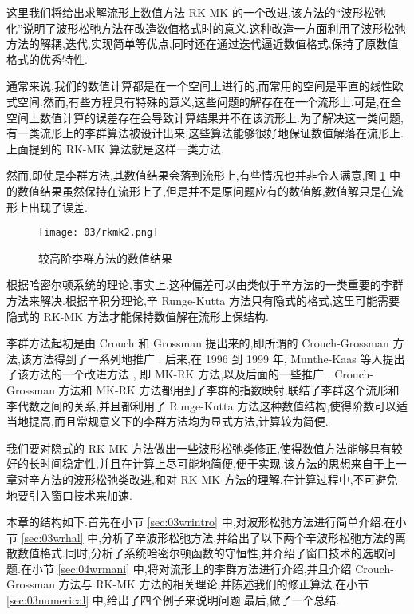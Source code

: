 这里我们将给出求解流形上数值方法 RK-MK \cite{arieh2005liegroup} 的一个改进,该方法的``波形松弛化''说明了波形松弛方法在改造数值格式时的意义.这种改造一方面利用了波形松弛方法的解耦,迭代,实现简单等优点,同时还在通过迭代逼近数值格式,保持了原数值格式的优秀特性.

通常来说,我们的数值计算都是在一个空间上进行的,而常用的空间是平直的线性欧式空间.然而,有些方程具有特殊的意义,这些问题的解存在在一个流形上.可是,在全空间上数值计算的误差存在会导致计算结果并不在该流形上.为了解决这一类问题,有一类流形上的李群算法被设计出来,这些算法能够很好地保证数值解落在流形上.上面提到的 RK-MK 算法就是这样一类方法.

然而,即使是李群方法,其数值结果会落到流形上,有些情况也并非令人满意,图 \ref{fig:rkmk2} 中的数值结果虽然保持在流形上了,但是并不是原问题应有的数值解,数值解只是在流形上出现了误差.
\begin{figure}[h!]
  \centering
  \texttt{[image: 03/rkmk2.png]}
  \caption{较高阶李群方法的数值结果}
  \label{fig:rkmk2}
\end{figure}

根据哈密尔顿系统的理论,事实上,这种偏差可以由类似于辛方法的一类重要的李群方法来解决.根据辛积分理论,辛 Runge-Kutta 方法只有隐式的格式,这里可能需要隐式的 RK-MK 方法才能保持数值解在流形上保结构.

李群方法起初是由 Crouch 和 Grossman \cite{crouch1993numerical} 提出来的,即所谓的 Crouch-Grossman 方法,该方法得到了一系列地推广 \cite{faleinsen2001multi,zaletkin2010numerical,bulychev2001numerical,buono2003numerical,billo1992numerical}. 后来,在 1996 到 1999 年, Munthe-Kaas  等人提出了该方法的一个改进方法 \cite{mk1996lie,mk1997numerical,mk1998runge,mk1999high}, 即 MK-RK 方法,以及后面的一些推广 \cite{ostermann2010exponential,owren2000the,bruls2012lie,munthe2013onpost,garcla2011onalg}. Crouch-Grossman 方法和 MK-RK 方法都用到了李群的指数映射,联结了李群这个流形和李代数之间的关系,并且都利用了 Runge-Kutta 方法这种数值结构,使得阶数可以适当地提高,而且常规意义下的李群方法均为显式方法,计算较为简便.

我们要对隐式的 RK-MK 方法做出一些波形松弛类修正,使得数值方法能够具有较好的长时间稳定性,并且在计算上尽可能地简便,便于实现.该方法的思想来自于上一章对辛方法的波形松弛类改进,和对 RK-MK 方法的理解.在计算过程中,不可避免地要引入窗口技术来加速.

本章的结构如下.首先在小节 \ref{sec:03wrintro} 中,对波形松弛方法进行简单介绍.在小节 \ref{sec:03wrhal} 中,分析了辛波形松弛方法,并给出了以下两个辛波形松弛方法的离散数值格式.同时,分析了系统哈密尔顿函数的守恒性,并介绍了窗口技术的选取问题.在小节 \ref{sec:04wrmani} 中,将对流形上的李群方法进行介绍,并且介绍 Crouch-Grossman 方法与 RK-MK 方法的相关理论,并陈述我们的修正算法.在小节 \ref{sec:03numerical} 中,给出了四个例子来说明问题.最后,做了一个总结.

